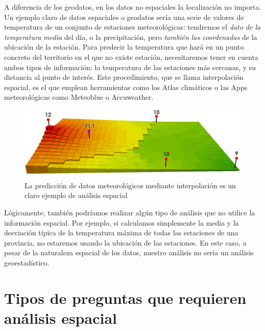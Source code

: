 \documentclass[
  letterpaper,
  DIV=11,
  numbers=noendperiod]{scrreprt}
\begin{document}
A diferencia de los geodatos, en los datos no espaciales la localización
no importa. Un ejemplo claro de datos espaciales o geodatos sería una
serie de valores de temperatura de un conjunto de estaciones
meteorológicas: tendremos el \emph{dato de la temperatura media} del
día, o la precipitación, pero \emph{también las coordenadas} de la
ubicación de la estación. Para predecir la temperatura que hará en un
punto concreto del territorio en el que no existe estación,
necesitaremos tener en cuenta ambos tipos de información: la temperatura
de las estaciones más cercanas, y su distancia al punto de interés. Este
procedimiento, que se llama interpolación espacial, es el que emplean
herramientas como los Atlas climáticos o las Apps meteorológicas como
Meteoblue o Accuweather.

\begin{figure}

{\centering \includegraphics{images/cover.png}

}

\caption{La predicción de datos meteorológicos mediante interpolación es
un claro ejemplo de análisis espacial}

\end{figure}

Lógicamente, también podríamos realizar algún tipo de análisis que no
utilice la información espacial. Por ejemplo, si calculamos simplemente
la media y la desviación típica de la temperatura máxima de todas las
estaciones de una provincia, no estaremos usando la ubicación de las
estaciones. En este caso, a pesar de la naturaleza espacial de los
datos, nuestro análisis no sería un análisis geoestadístico.

\hypertarget{tipos-de-preguntas-que-requieren-anuxe1lisis-espacial}{%
\section*{Tipos de preguntas que requieren análisis
espacial}\label{tipos-de-preguntas-que-requieren-anuxe1lisis-espacial}}
\end{document}
